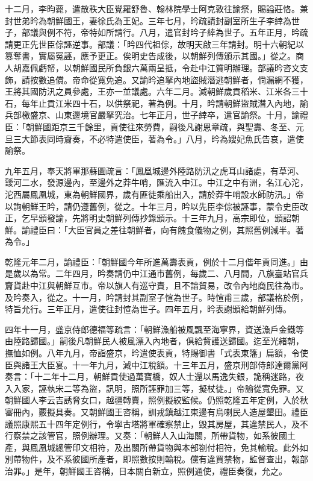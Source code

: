 \begin{pinyinscope}
十二月，李昀薨，遣散秩大臣覺羅舒魯、翰林院學士阿克敦往諭祭，賜謚莊恪。兼封世弟昑為朝鮮國王，妻徐氏為王妃。三年七月，昑疏請封副室所生子李緈為世子，部議與例不符，帝特如所請行。八月，遣官封昑子緈為世子。五年正月，昑疏請更正先世臣倧誣逆事。部議：「昑四代祖倧，故明天啟三年請封。明十六朝紀以篡奪書，實屬冤誣，應予更正。俟明史告成後，以朝鮮列傳頒示其國。」從之。商人胡嘉佩虧帑，以朝鮮國民所負銀六萬兩呈抵，令赴中江質明辦理。部議昑咨文支飾，請按數追償。帝命從寬免追。又諭昑追拏內地盜賊潛逃朝鮮者，倘漏網不獲，王將其國防汛之員參處，王亦一並議處。六年二月。減朝鮮歲貢稻米、江米各三十石，每年止貢江米四十石，以供祭祀，著為例。十月，昑請朝鮮盜賊潛入內地，諭兵部檄盛京、山東邊境官嚴拏究治。七年正月，世子緈卒，遣官諭祭。十月，諭禮臣：「朝鮮國距京三千餘里，貢使往來勞費，嗣後凡謝恩章疏，與聖壽、冬至、元旦三大節表同時齎奏，不必特遣使臣，著為令。」八月，昑為嫂妃魚氏告哀，遣使諭祭。

九年五月，奉天將軍那蘇圖疏言：「鳳凰城邊外陸路防汛之虎耳山諸處，有草河、靉河二水，發源邊內，至邊外之莽牛哨，匯流入中江。中江之中有洲，名江心沱，沱西屬鳳凰城，東為朝鮮國界，歲有匪徒乘船出入，請於莽牛哨設水師防汛。」帝以詢朝鮮王昑，請仍遵舊例，從之。十年三月，昑以先臣李倧被誣事，蒙令史臣改正，乞早頒發諭，先將明史朝鮮列傳抄錄頒示。十三年九月，高宗即位，頒詔朝鮮。諭禮臣曰：「大臣官員之差往朝鮮者，向有餽食儀物之例，其照舊例減半。著為令。」

乾隆元年二月，諭禮臣：「朝鮮國今年所進萬壽表貢，例於十二月偕年貢同進。」由是歲以為常。二年四月，昑奏請仍中江通市舊例，每歲二、八月間，八旗臺站官兵齎貨赴中江與朝鮮互市。帝以旗人有巡守責，且不諳貿易，改令內地商民往為市。及昑奏入，從之。十一月，昑請封其副室子愃為世子。時愃甫三歲，部議格於例，特旨允行。三年正月，遣使往封愃為世子。四年五月，昑表謝頒給朝鮮列傳。

四年十一月，盛京侍郎德福等疏言：「朝鮮漁船被風飄至海寧界，資送漁戶金鐵等由陸路歸國。」嗣後凡朝鮮民人被風漂入內地者，俱給貲護送歸國。迄至光緒朝，撫恤如例。八年九月，帝詣盛京，昑遣使表貢，特賜御書「式表東籓」扁額，令使臣與諸王大臣宴。十一年九月，減中江稅額。十三年五月，盛京刑部侍郎達爾黨阿奏言：「十二年十二月，朝鮮貢使過萬寶橋，奴人士還以馬逸失銀，詭稱迷路，夜入入家，誣執宋二等為盜，訊明，照所誣罪加三等，擬杖徒。」帝諭從寬免罪。又朝鮮國人李云吉誘脅女口，越疆轉賣，照例擬絞監候。仍照乾隆五年定例，入於秋審冊內，覈擬具奏。又朝鮮國王咨稱，訓戎鎮越江東邊有烏喇民人造屋墾田。禮臣議照康熙五十四年定例行，令寧古塔將軍確察禁止，毀其房屋，其違禁民人，及不行察禁之該管官，照例辦理。又奏：「朝鮮人入山海關，所帶貨物，如系彼國土產，與鳳凰城總管印文相符，及出關所帶貨物與本部劄付相符，免其輸稅。此外如別帶物件，及不系彼國所產者，即照數按則輸稅。儻有違買禁物，監督查出，報部治罪。」是年，朝鮮國王咨稱，日本關白新立，照例通使，禮臣奏復，允之。


\end{pinyinscope}
